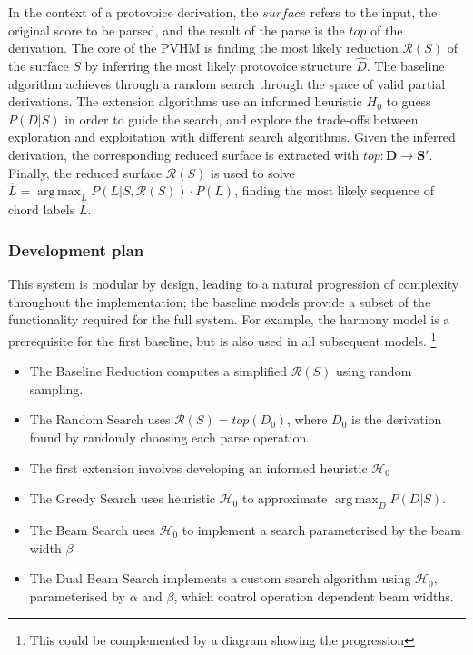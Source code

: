 \documentclass[12pt,a4paper,twoside,openright]{report}
\DeclareMathOperator*{\argmax}{arg\,max}
\theoremstyle{definition}
\begin{document}

In the context of a protovoice derivation, the $surface$ refers to the input, the original score to be parsed, and the result of the parse is the $top$ of the derivation. 
The core of the PVHM is finding the most likely reduction $\mathcal{R}(S)$ of the surface $S$ by inferring the most likely protovoice structure $\hat{D}$. 
The baseline algorithm achieves through a random search through the space of valid partial derivations. 
The extension algorithms use an informed heuristic $H_0$ to guess $P(D|S)$ in order to guide the search, and explore the trade-offs between exploration and exploitation with different search algorithms. 
Given the inferred derivation, the corresponding reduced surface is extracted with $top:\mathbf{D} \to \mathbf{S'}$. 
Finally, the reduced surface $\mathcal{R}(S)$ is used to solve $\hat{L} = \argmax_L P(L|S, \mathcal{R}(S)) \cdot P(L)$, finding the most likely sequence of chord labels $\hat{L}$. 

\subsubsection{Development plan}
This system is modular by design, leading to a natural progression of complexity throughout the implementation; the baseline models provide a subset of the functionality required for the full system. For example, the harmony model is a prerequisite for the first baseline, but is also used in all subsequent models. \footnote{This could be complemented by a diagram showing the progression}

\begin{itemize}
  \item The Baseline Reduction computes a simplified $\mathcal{R}(S)$ using random sampling. 
  \item The Random Search uses $\mathcal{R}(S) = top (D_0)$, where $D_0$ is the derivation found by randomly choosing each parse operation. 
  \item The first extension involves developing an informed heuristic $\mathcal{H}_0$
  \item The Greedy Search uses heuristic $\mathcal{H}_0$ to approximate $\argmax_D P(D|S)$.
  \item The Beam Search uses $\mathcal{H}_0$ to implement a search parameterised by the beam width $\beta$
  \item The Dual Beam Search implements a custom search algorithm using $\mathcal{H}_0$, parameterised by $\alpha$ and $\beta$, which control operation dependent beam widths.  
\end{itemize}
\end{document}
